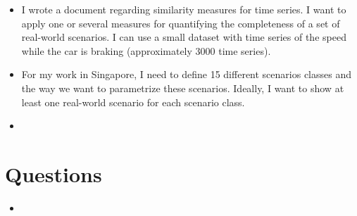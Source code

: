 \documentclass[10pt,final,a4paper,oneside,onecolumn]{article}
\begin{document}
\begin{itemize}
	\item I wrote a document regarding similarity measures for time series. I want to apply one or several measures for quantifying the completeness of a set of real-world scenarios. I can use a small dataset with time series of the speed while the car is braking (approximately 3000 time series).
	\item For my work in Singapore, I need to define 15 different scenarios classes and the way we want to parametrize these scenarios. Ideally, I want to show at least one real-world scenario for each scenario class.
	\item 
\end{itemize}

\section{Questions}

\begin{itemize}
	\item 
\end{itemize}




\newpage

\label{ivpaper}

\end{document}
